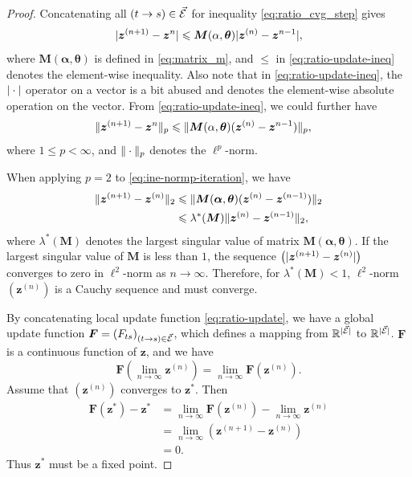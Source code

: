 \begin{proof}
  
  Concatenating all $(t\rightarrow s) \in \vec{\mathcal{E}}$ for inequality \eqref{eq:ratio_cvg_step} gives
  \begin{equation}\label{eq:ratio-update-ineq}
    | \bm{z}^{(n+1)} - \bm{z}^{n} | \leqslant \bm{M}(\alpha, \bm{\theta})| \bm{z}^{(n)} - \bm{z}^{n-1} |,
  \end{equation}
  where $\bm{M}(\bm{\alpha}, \bm{\theta})$ is defined in \eqref{eq:matrix_m}, and $\leq$ in \eqref{eq:ratio-update-ineq} denotes the element-wise inequality. Also note that in \eqref{eq:ratio-update-ineq}, the $| \cdot |$ operator on a vector is a bit abused and denotes the element-wise absolute operation on the vector. From \eqref{eq:ratio-update-ineq}, we could further have
  \begin{align}\label{eq:ine-normp-iteration}
    \| \bm{z}^{(n+1)} - \bm{z}^{n} \|_{p} &\leqslant \| \bm{M}(\alpha, \bm{\theta})(\bm{z}^{(n)} - \bm{z}^{n-1}) \|_{p},               
  \end{align}
  where $1\leq p < \infty$, and $\| \cdot \|_p$ denotes the ${\ell}^p$-norm.

  When applying $p=2$ to \eqref{eq:ine-normp-iteration}, we have
  \begin{align}\label{eq:ieq-largest-singular}
    \| \bm{z}^{(n+1)} - \bm{z}^{(n)} \|_{2} &\leqslant \| \bm{M}(\bm{\alpha}, \bm{\theta})(\bm{z}^{(n)} - \bm{z}^{(n-1)}) \|_{2} \nonumber \\
                                          &\leqslant \lambda^{\ast}(\bm{M})\| \bm{z}^{(n)} - \bm{z}^{(n-1)} \|_{2},
  \end{align}
  where $\lambda^{\ast}(\bm{M})$ denotes the largest singular value of matrix
  $\bm{M}(\bm{\alpha}, \bm{\theta})$. If the largest singular value of $\bm{M}$ is less than $1$, the sequence
  $\left( | \bm{z}^{(n+1)} - \bm{z}^{(n)} |\right)$ converges to zero in $\ell^2$-norm as $n \rightarrow \infty$. Therefore, for $\lambda^{\ast}(\bm{M})<1$, $\ell^2$-norm $\left(  \bm{z}^{(n)}  \right)$ is a Cauchy sequence and must converge. 

  By concatenating local update function \eqref{eq:ratio-update}, we have a global update function $\bm{F} = \left(  F_{ts}  \right)_{ (t \rightarrow s) \in \vec{\mathcal{E}}}$, which defines a mapping from $\mathbb{R}^{| \vec{\mathcal{E}} |}$ to $\mathbb{R}^{| \vec{\mathcal{E}} |}$. $\bm{F}$ is a continuous function of $\bm{z}$, and we have
  \begin{equation}
    \bm{F}(\lim_{n\rightarrow \infty}\bm{z}^{(n)}) = \lim_{n\rightarrow \infty}\bm{F}(\bm{z}^{(n)}).
  \end{equation}
  Assume that $\left(  \bm{z}^{(n)} \right)$ converges to
  $\bm{z}^{\ast}$. Then
  \begin{align}
    \bm{F}(\bm{z}^{\ast}) - \bm{z}^{\ast}
    &= \lim_{n\rightarrow \infty} \bm{F}(\bm{z}^{(n)}) -\lim_{n\rightarrow
      \infty} \bm{z}^{(n)} \nonumber \\
    &= \lim_{n\rightarrow \infty} (\bm{z}^{(n+1)} - \bm{z}^{(n)}) \nonumber \\
    &= 0.
  \end{align}
  Thus $\bm{z}^{\ast}$ must be a fixed point.


\end{proof}
